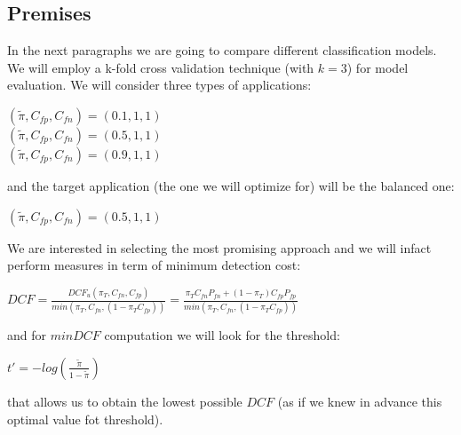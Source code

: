 \documentclass[10pt, a4paper, twocolumn]{article} %
\begin{document}
\subsection{Premises}
In the next paragraphs we are going to compare different classification models. 
We will employ a k-fold cross validation technique (with $k=3$) for model evaluation.
We will consider three types of applications:
\begin{center}
	$(\tilde{\pi}, C_{fp}, C_{fn}) = (0.1, 1, 1)$\\
	$(\tilde{\pi}, C_{fp}, C_{fn}) = (0.5, 1, 1)$\\
	$(\tilde{\pi}, C_{fp}, C_{fn}) = (0.9, 1, 1)$\\
\end{center}
and the target application (the one we will optimize for) will be the balanced one:
\begin{center}
	$(\tilde{\pi}, C_{fp}, C_{fn}) = (0.5, 1, 1)$
\end{center}
We are interested
in selecting the most promising approach and we will infact perform measures in term of minimum
detection cost:
\begin{center}
	\begin{math}
		DCF = \frac{DCF_{u}(\pi_{T}, C_{fn}, C_{fp})}{min(\pi_{T},C_{fn}, (1-\pi_{T}C_{fp}))} = 
			\frac{\pi_{T}C_{fn}P_{fn} + (1-\pi_{T})C_{fp}P_{fp}}{min(\pi_{T},C_{fn}, (1-\pi_{T}C_{fp}))}
	\end{math}
\end{center}
and for $minDCF$ computation we will look for the threshold:
\begin{center}
	\begin{math}
		t' = -log(\frac{\tilde{\pi}}{1-\tilde{\pi}})
	\end{math}
\end{center}
that allows us to obtain the lowest possible $DCF$ (as if we knew in advance this optimal value fot threshold).
\end{document}
